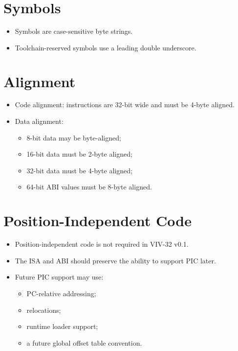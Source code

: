 \section{Symbols}

\begin{itemize}
  \item Symbols are case-sensitive byte strings.
  \item Toolchain-reserved symbols use a leading double underscore.
\end{itemize}

\section{Alignment}

\begin{itemize}
  \item Code alignment: instructions are 32-bit wide and must be 4-byte aligned.
  \item Data alignment:
  \begin{itemize}
    \item 8-bit data may be byte-aligned;
    \item 16-bit data must be 2-byte aligned;
    \item 32-bit data must be 4-byte aligned;
    \item 64-bit ABI values must be 8-byte aligned.
  \end{itemize}
\end{itemize}

\section{Position-Independent Code}

\begin{itemize}
  \item Position-independent code is not required in VIV-32 v0.1.
  \item The ISA and ABI should preserve the ability to support PIC later.
  \item Future PIC support may use:
  \begin{itemize}
    \item PC-relative addressing;
    \item relocations;
    \item runtime loader support;
    \item a future global offset table convention.
  \end{itemize}
\end{itemize}

